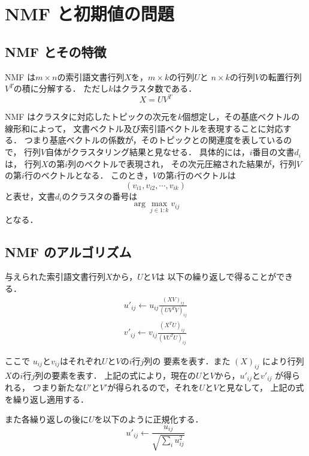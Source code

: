 \documentclass[japanese]{jnlp_1.3e}
\begin{document}
\section{NMF と初期値の問題}


\subsection{NMF とその特徴}

NMF は\( m \times n \)の索引語文書行列\( X \)を，\( m \times k \)の行列\( U \)と
\( n \times k \)の行列\( V \)の転置行列\( V^{T} \)の積に分解する\cite{nmf}．
ただし\( k \)はクラスタ数である．
\[
X = U V^{T}   
\]

NMF はクラスタに対応したトピックの次元を\( k \)個想定し，その基底ベクトルの線形和によって，
文書ベクトル及び索引語ベクトルを表現することに対応する．
つまり基底ベクトルの係数が，そのトピックとの関連度を表しているので，
行列\( V \)自体がクラスタリング結果と見なせる．
具体的には，\( i \)番目の文書\( d_i \)は，
行列\( X \)の第\( i \)列のベクトルで表現され，
その次元圧縮された結果が，行列\( V \)の第\( i \)行のベクトルとなる．
このとき，\( V \)の第\( i \)行のベクトルは
\[
(v_{i1}, v_{i2}, \cdots, v_{ik})
\]
と表せ，文書\( d_i \)のクラスタの番号は
\[
\arg \max_{j \in 1:k} v_{ij}
\]
となる．

\subsection{NMF のアルゴリズム}

与えられた索引語文書行列\( X \)から，\( U \)と\( V \)は
以下の繰り返しで得ることができる\cite{lee00algorithms}． 
\begin{gather}
  \label{eq:1}
 u'_{ij} \leftarrow u_{ij} \frac{(XV)_{ij}}{(UV^{T}V)_{ij}}   \\
  \label{eq:2}
 v'_{ij} \leftarrow v_{ij} \frac{(X^{T}U)_{ij}}{(VU^{T}U)_{ij}} 
\end{gather}

ここで \( u_{ij} \)と\( v_{ij} \)はそれぞれ\( U \)と\( V \)の\( i \)行\( j \)列の
要素を表す．また \( (X)_{ij} \) により行列\( X \)の\( i \)行\( j \)列の要素を表す．
上記の式により，現在の\( U \)と\( V \)から，\( u'_{ij} \)と\( v'_{ij} \) が得られる，
つまり新たな\( U' \)と\( V' \)が得られるので，それを\( U \)と\( V \)と見なして，
上記の式を繰り返し適用する．

また各繰り返しの後に\( U \)を以下のように正規化する．
\begin{equation}
 u'_{ij} \leftarrow \frac{u_{ij}}{\sqrt{\sum_{i} u_{ij}^2}} 
\end{equation}
\end{document}
